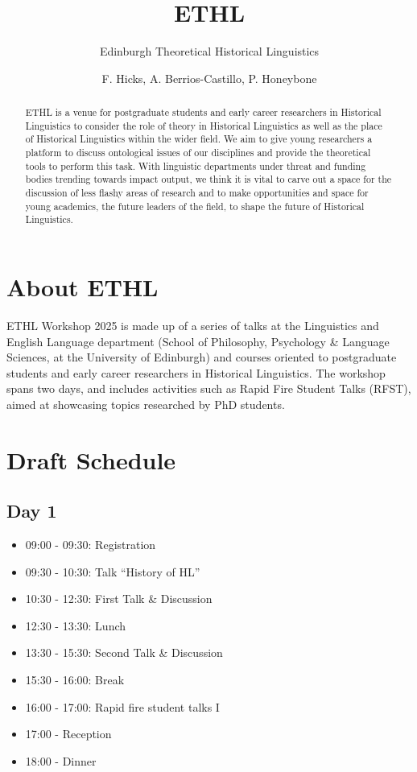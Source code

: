 \documentclass[]{scrartcl}
\title{ETHL}
\subtitle{Edinburgh Theoretical Historical Linguistics}
\author{F. Hicks, A. Berrios-Castillo, P. Honeybone}
\begin{document}
\maketitle

\begin{abstract}

ETHL is a venue for postgraduate students and early career researchers in Historical Linguistics to consider the role of theory in Historical Linguistics as well as the place of Historical Linguistics within the wider field. We aim to give young researchers a platform to discuss ontological issues of our disciplines and provide the theoretical tools to perform this task. With linguistic departments under threat and funding bodies trending towards impact output, we think it is vital to carve out a space for the discussion of less flashy areas of research and to make opportunities and space for young academics, the future leaders of the field, to shape the future of Historical Linguistics.

\end{abstract}

\section{About ETHL}

ETHL Workshop 2025 is made up of a series of talks at the Linguistics and English Language department (School of Philosophy, Psychology \& Language Sciences, at the University of Edinburgh) and courses oriented to postgraduate students and early career researchers in Historical Linguistics. The workshop spans two days, and includes activities such as Rapid Fire Student Talks (RFST), aimed at showcasing topics researched by PhD students.


\newpage

\section{Draft Schedule}

\subsection*{Day 1}
\begin{itemize}
	\item 09:00 - 09:30: Registration
	\item 09:30 - 10:30: Talk “History of HL”
	\item 10:30 - 12:30: First Talk \& Discussion
	\item 12:30 - 13:30: Lunch
	\item 13:30 - 15:30: Second Talk \& Discussion
	\item 15:30 - 16:00: Break
	\item 16:00 - 17:00: Rapid fire student talks I
	\item 17:00 - Reception
	\item 18:00 - Dinner
\end{itemize}
\end{document}
